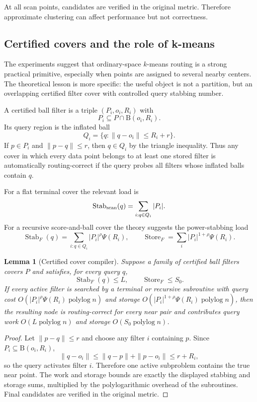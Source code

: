 \documentclass[10pt]{article}
\newtheorem{lemma}[theorem]{Lemma}
\theoremstyle{definition}
\newcommand{\Ball}{\mathrm{B}}
\newcommand{\polylog}{\operatorname{polylog}}
\begin{document}
At all scan points, candidates are verified in the original metric. Therefore approximate clustering can affect performance but not correctness.

\subsection{Certified covers and the role of k-means}

The experiments suggest that ordinary-space $k$-means routing is a strong
practical primitive, especially when points are assigned to several nearby
centers. The theoretical lesson is more specific: the useful object is not a
partition, but an overlapping certified filter cover with controlled query
stabbing number.

A certified ball filter is a triple $(P_i,o_i,R_i)$ with
\[
   P_i\subseteq P\cap \Ball(o_i,R_i).
\]
Its query region is the inflated ball
\[
   Q_i=\{q:\|q-o_i\|\le R_i+r\}.
\]
If $p\in P_i$ and $\|p-q\|\le r$, then $q\in Q_i$ by the triangle inequality.
Thus any cover in which every data point belongs to at least one stored filter
is automatically routing-correct if the query probes all filters whose inflated
balls contain $q$.

For a flat terminal cover the relevant load is
\[
   \operatorname{Stab}_{\rm scan}(q)
   =
   \sum_{i:q\in Q_i}|P_i|.
\]
For a recursive score-and-ball cover the theory suggests the power-stabbing
load
\[
   \operatorname{Stab}_F(q)
   =
   \sum_{i:q\in Q_i}|P_i|^{\rho}\Psi(R_i),
   \qquad
   \operatorname{Store}_F
   =
   \sum_i |P_i|^{1+\rho}\Psi(R_i).
\]

\begin{lemma}[Certified cover compiler]\label{lem:certified-cover-compiler}
   Suppose a family of certified ball filters covers $P$ and satisfies, for
   every query $q$,
   \[
      \operatorname{Stab}_F(q)\le L,
      \qquad
      \operatorname{Store}_F\le S_0.
   \]
   If every active filter is searched by a terminal or recursive subroutine with
   query cost $O(|P_i|^\rho\Psi(R_i)\polylog n)$ and storage
   $O(|P_i|^{1+\rho}\Psi(R_i)\polylog n)$, then the resulting node is
   routing-correct for every near pair and contributes query work
   $O(L\polylog n)$ and storage $O(S_0\polylog n)$.
\end{lemma}

\begin{proof}
   Let $\|p-q\|\le r$ and choose any filter $i$ containing $p$. Since
   $P_i\subseteq\Ball(o_i,R_i)$,
   \[
      \|q-o_i\|\le\|q-p\|+\|p-o_i\|\le r+R_i,
   \]
   so the query activates filter $i$. Therefore one active subproblem contains
   the true near point. The work and storage bounds are exactly the displayed
   stabbing and storage sums, multiplied by the polylogarithmic overhead of the
   subroutines. Final candidates are verified in the original metric.
\end{proof}
\end{document}
